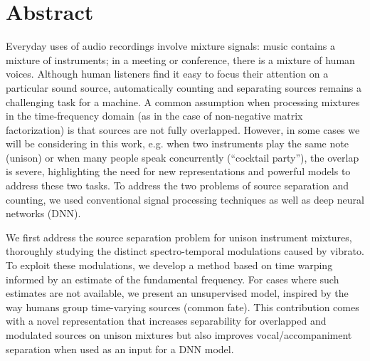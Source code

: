 \begingroup
\let\clearpage\relax
\let\cleardoublepage\relax
\let\cleardoublepage\relax

\chapter*{Abstract}
Everyday uses of audio recordings involve mixture signals: music contains a mixture of instruments; in a meeting or conference, there is a mixture of human voices.
Although human listeners find it easy to focus their attention on a particular sound source, automatically counting and separating sources remains a challenging task for a machine.
A common assumption when processing mixtures in the time-frequency domain (as in the case of non-negative matrix factorization) is that sources are not fully overlapped.  However, in some cases we will be considering in this work, e.g. when two instruments play the same note (unison) or when many people speak concurrently (``cocktail party''), the overlap is severe, highlighting the need for new representations and powerful models to address these two tasks.
To address the two problems of source separation and counting, we used conventional signal processing techniques as well as deep neural networks (DNN).

We first address the source separation problem for unison instrument mixtures,
thoroughly studying the distinct spectro-temporal modulations caused by vibrato.
To exploit these modulations, we develop a method based on time warping informed by an estimate of the fundamental frequency.
For cases where such estimates are not available, we present an unsupervised model, inspired by the way humans group time-varying sources (common fate).
This contribution comes with a novel representation that increases separability for overlapped and modulated sources on unison mixtures but also improves vocal/accompaniment separation when used as an input for a DNN model.

